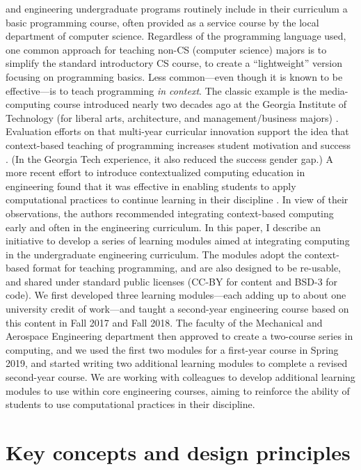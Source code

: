 \documentclass[10pt,journal,compsoc]{IEEEtran}
\begin{document}
 and engineering undergraduate programs routinely include in their curriculum a basic programming course, often provided as a service course by the local department of computer science. 
Regardless of the programming language used, one common approach for teaching non-CS (computer science) majors is to simplify the standard introductory CS course, to create a ``lightweight'' version focusing on programming basics. 
Less common---even though it is known to be effective---is to teach programming \emph{in context}. 
The classic example is the media-computing course introduced nearly two decades ago at the Georgia Institute of Technology (for liberal arts, architecture, and management/business majors) \cite{guzdial2003media,guzdial2005design}. 
Evaluation efforts on that multi-year curricular innovation support the idea that context-based teaching of programming increases student motivation and success \cite{forte2005motivation,guzdial2013exploring}. 
(In the Georgia Tech experience, it also reduced the success gender gap.) 
A more recent effort to introduce contextualized computing education in engineering found that it was effective in enabling students to apply computational practices to continue learning in their discipline \cite{magana2016case}. 
In view of their observations, the authors recommended integrating context-based computing early and often in the engineering curriculum. 
In this paper, I describe an initiative to develop a series of learning modules aimed at integrating computing in the undergraduate engineering curriculum. 
The modules adopt the context-based format for teaching programming, and are also designed to be re-usable, and shared under standard public licenses (CC-BY for content and BSD-3 for code). 
We first developed three learning modules---each adding up to about one university credit of work---and taught a second-year engineering course based on this content  in Fall 2017 and Fall 2018. 
The faculty of the Mechanical and Aerospace Engineering department then approved to create a two-course series in computing, and we used the first two modules for a first-year course in Spring 2019, and started writing two additional learning modules to complete a revised second-year course. 
We are working with colleagues to develop additional learning modules to use within core engineering courses, aiming to reinforce the ability of students to use computational practices in their discipline. 

\section{Key concepts and design principles}
\end{document}
